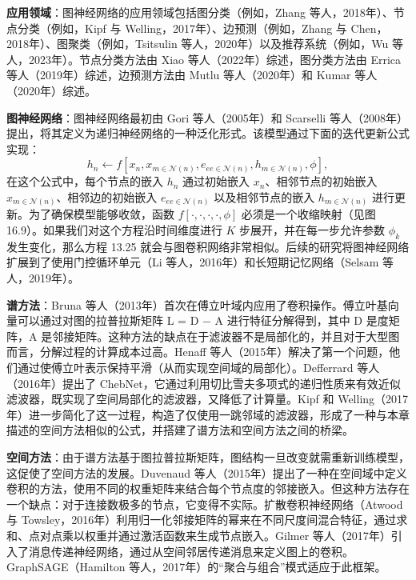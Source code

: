 \textbf{应用领域}：图神经网络的应用领域包括图分类（例如，Zhang 等人，2018年）、节点分类（例如，Kipf 与 Welling，2017年）、边预测（例如，Zhang 与 Chen，2018年）、图聚类（例如，Tsitsulin 等人，2020年）以及推荐系统（例如，Wu 等人，2023年）。节点分类方法由 Xiao 等人（2022年）综述，图分类方法由 Errica 等人（2019年）综述，边预测方法由 Mutlu 等人（2020年）和 Kumar 等人（2020年）综述。

\textbf{图神经网络}：图神经网络最初由 Gori 等人（2005年）和 Scarselli 等人（2008年）提出，将其定义为递归神经网络的一种泛化形式。该模型通过下面的迭代更新公式实现：
\begin{equation}
h_n \leftarrow f \left[ x_n, x_{m\in \mathcal{N}(n)}, e_{ee\in \mathcal{N}(n)}, h_{m\in \mathcal{N}(n)}, \phi \right], 
\end{equation}
在这个公式中，每个节点的嵌入 \(h_n\) 通过初始嵌入 \(x_n\)、相邻节点的初始嵌入 \(x_{m\in \mathcal{N}(n)}\)、相邻边的初始嵌入 \(e_{ee\in \mathcal{N}(n)}\) 以及相邻节点的嵌入 \(h_{m\in \mathcal{N}(n)}\) 进行更新。为了确保模型能够收敛，函数 \(f[\cdot, \cdot, \cdot, \cdot, \phi]\) 必须是一个收缩映射（见图 16.9）。如果我们对这个方程沿时间维度进行 \(K\) 步展开，并在每一步允许参数 \(\phi_k\) 发生变化，那么方程 13.25 就会与图卷积网络非常相似。后续的研究将图神经网络扩展到了使用门控循环单元（Li 等人，2016年）和长短期记忆网络（Selsam 等人，2019年）。

\textbf{谱方法}：Bruna 等人（2013年）首次在傅立叶域内应用了卷积操作。傅立叶基向量可以通过对图的拉普拉斯矩阵 L = D − A 进行特征分解得到，其中 D 是度矩阵，A 是邻接矩阵。这种方法的缺点在于滤波器不是局部化的，并且对于大型图而言，分解过程的计算成本过高。Henaff 等人（2015年）解决了第一个问题，他们通过使傅立叶表示保持平滑（从而实现空间域的局部化）。Defferrard 等人（2016年）提出了 ChebNet，它通过利用切比雪夫多项式的递归性质来有效近似滤波器，既实现了空间局部化的滤波器，又降低了计算量。Kipf 和 Welling（2017年）进一步简化了这一过程，构造了仅使用一跳邻域的滤波器，形成了一种与本章描述的空间方法相似的公式，并搭建了谱方法和空间方法之间的桥梁。

\textbf{空间方法}：由于谱方法基于图拉普拉斯矩阵，图结构一旦改变就需重新训练模型，这促使了空间方法的发展。Duvenaud 等人（2015年）提出了一种在空间域中定义卷积的方法，使用不同的权重矩阵来结合每个节点度的邻接嵌入。但这种方法存在一个缺点：对于连接数极多的节点，它变得不实际。扩散卷积神经网络（Atwood 与 Towsley，2016年）利用归一化邻接矩阵的幂来在不同尺度间混合特征，通过求和、点对点乘以权重并通过激活函数来生成节点嵌入。Gilmer 等人（2017年）引入了消息传递神经网络，通过从空间邻居传递消息来定义图上的卷积。GraphSAGE（Hamilton 等人，2017年）的“聚合与组合”模式适应于此框架。

